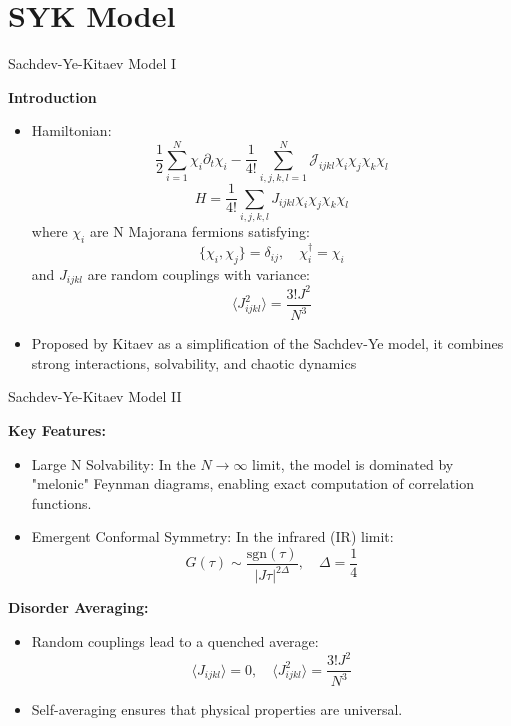 \section{SYK Model}

\begin{frame}[t]{Sachdev-Ye-Kitaev Model I}

\textbf{Introduction}
\begin{itemize}
	\item Hamiltonian:
	\[ \frac{1}{2} \sum_{i=1}^N \chi_i \partial_t \chi_i - \frac{1}{4!} \sum_{i,j,k,l=1}^N \mathcal{J}_{i j k l} \chi_i \chi_j \chi_k \chi_l \]
	\[H = \frac{1}{4!} \sum_{i,j,k,l} J_{ijkl} \chi_i \chi_j \chi_k \chi_l\]
	where $\chi_i$ are N Majorana fermions satisfying:
	\[\{\chi_i, \chi_j\} = \delta_{ij}, \quad \chi_i^\dagger = \chi_i\]
	and $J_{ijkl}$ are random couplings with variance:
	\[\langle J_{ijkl}^2 \rangle = \frac{3! J^2}{N^3}\]

	\item Proposed by Kitaev as a simplification of the Sachdev-Ye model, it combines strong interactions, solvability, and chaotic dynamics
\end{itemize}

\end{frame}


\begin{frame}{Sachdev-Ye-Kitaev Model II} %

\textbf{Key Features:}
\begin{itemize}
	\item Large N Solvability: In the $N\to\infty$ limit, the model is dominated by "melonic" Feynman diagrams, enabling exact computation of correlation functions.
	\item Emergent Conformal Symmetry: In the infrared (IR) limit:
	\[G(\tau) \sim \frac{\text{sgn}(\tau)}{|J\tau|^{2\Delta}}, \quad \Delta = \frac{1}{4}\]
\end{itemize}

\textbf{Disorder Averaging:}
\begin{itemize}
	\item Random couplings lead to a quenched average:
    \[\langle J_{ijkl} \rangle = 0, \quad \langle J_{ijkl}^2 \rangle = \frac{3!J^2}{N^3}\]
    \item Self-averaging ensures that physical properties are universal.
\end{itemize}

\end{frame}